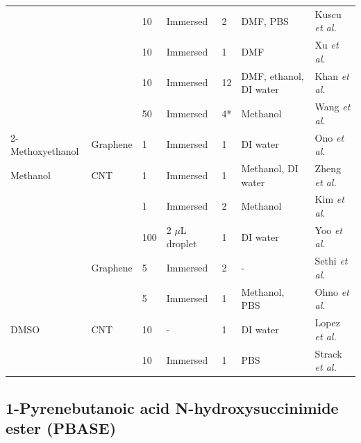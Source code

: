 \documentclass[
  a4paper,
]{scrbook}
\begin{document}
\begin{longtable}[]{@{}lllllll@{}}
& & 10 & Immersed & 2 & DMF, PBS & Kuscu \textit{et al.}
\cite{Kuscu2020} \\
& & 10 & Immersed & 1 & DMF & Xu \textit{et al.} \cite{Xu2017} \\
& & 10 & Immersed & 12 & DMF, ethanol, DI water & Khan \textit{et al.}
\cite{Khan2020} \\
& & 50 & Immersed & 4* & Methanol & Wang \textit{et al.}
\cite{Wang2020} \\
2-Methoxyethanol & Graphene & 1 & Immersed & 1 & DI water & Ono
\textit{et al.} \cite{Ono2020} \\
Methanol & CNT & 1 & Immersed & 1 & Methanol, DI water & Zheng
\textit{et al.} \cite{Zheng2016} \\
& & 1 & Immersed & 2 & Methanol & Kim \textit{et al.} \cite{Kim2009} \\
& & 100 & 2 \(\mu\)L droplet & 1 & DI water & Yoo \textit{et al.}
\cite{Yoo2022} \\
& Graphene & 5 & Immersed & 2 & - & Sethi \textit{et al.}
\cite{Sethi2020} \\
& & 5 & Immersed & 1 & Methanol, PBS & Ohno \textit{et al.}
\cite{Ohno2010} \\
DMSO & CNT & 10 & - & 1 & DI water & Lopez \textit{et al.}
\cite{Lopez2015} \\
& & 10 & Immersed & 1 & PBS & Strack \textit{et al.}
\cite{Strack2013} \\
\bottomrule()
\end{longtable}

\newpage
{}

\hypertarget{sec-PBASE}{%
\subsection{1-Pyrenebutanoic acid N-hydroxysuccinimide ester
(PBASE)}\label{sec-PBASE}}
\end{document}

